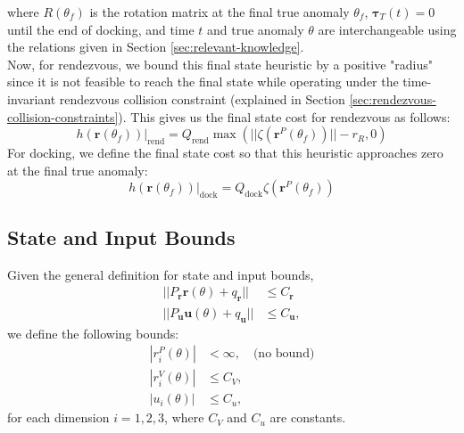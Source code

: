 where $R(\theta_f)$ is the rotation matrix at the final true anomaly $\theta_f$, $\boldsymbol{\tau}_T(t)=0$ until the end of docking, and time $t$ and true anomaly $\theta$ are interchangeable using the relations given in Section \ref{sec:relevant-knowledge}.\\
Now, for rendezvous, we bound this final state heuristic by a positive "radius" since it is not feasible to reach the final state while operating under the time-invariant rendezvous collision constraint (explained in Section \ref{sec:rendezvous-collision-constraints}).
This gives us the final state cost for rendezvous as follows:
\begin{equation}
    h(\boldsymbol{r}(\theta_f))|_{\text{rend}}=Q_\text{rend}\max{\left(||\zeta(\boldsymbol{r}^P(\theta_f))||-r_R, 0\right)}
\end{equation}
For docking, we define the final state cost so that this heuristic approaches zero at the final true anomaly:
\begin{equation}
    h(\boldsymbol{r}(\theta_f))|_{\text{dock}}=Q_\text{dock}\zeta(\boldsymbol{r}^P(\theta_f))
\end{equation}
\subsection{State and Input Bounds}
\label{sec:state-input-bounds}
Given the general definition for state and input bounds, \cite{brett2019dynamic}
\begin{align}
    ||P_{\boldsymbol{r}}\boldsymbol{r}(\theta)+q_{\boldsymbol{r}}||&\leq C_{\boldsymbol{r}}\\
    ||P_{\boldsymbol{u}}\boldsymbol{u}(\theta)+q_{\boldsymbol{u}}||&\leq C_{\boldsymbol{u}},
\end{align}
we define the following bounds:
\begin{align}
    |r_i^P(\theta)|&<    \infty,\quad\text{(no bound)}\\
    |r_i^V(\theta)|&\leq C_{V},\\
    |u_i  (\theta)|&\leq C_{u},
\end{align}
for each dimension $i=1,2,3$, where $C_{V}$ and $C_{u}$ are constants.
